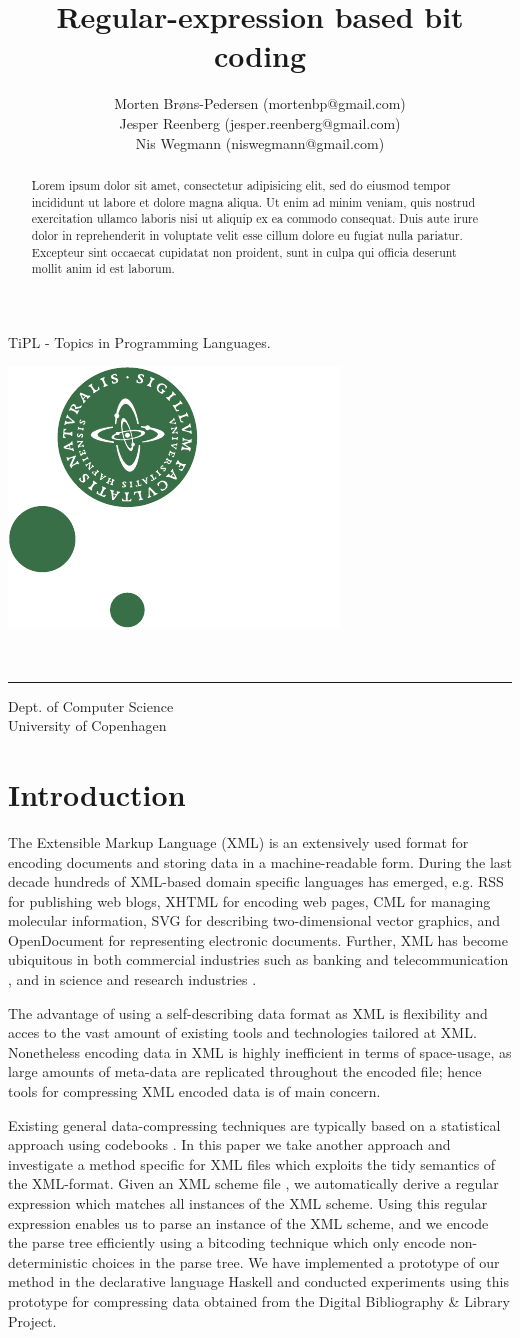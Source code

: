 \documentclass[a4paper, oneside]{memoir}
\title{Regular-expression based bit coding}
\author{Morten Brøns-Pedersen {\footnotesize (mortenbp@gmail.com)}\\
Jesper Reenberg {\footnotesize (jesper.reenberg@gmail.com)} \\
Nis Wegmann {\footnotesize (niswegmann@gmail.com)}}
\makeatletter
\theoremstyle{definition}
\def\maketitle{%
  \null
  \thispagestyle{empty}%
  \vfill
  \begin{center}\leavevmode
    \normalfont
    \Huge{\raggedleft \@title\par}%
    \hrulefill\par
    \Large{\raggedright \subtitle\par}%
    \vskip 2cm
    {\@date\par}%
  \end{center}%
  \vfill
\begin{minipage}{80pt}
\includegraphics*[scale=0.75]{imgs/nat-logo}
\end{minipage}
\begin{minipage}{300pt}
  \begin{flushleft}
    {\large \@author } \\
    {\footnotesize \suplementInfo }

  \end{flushleft}
\end{minipage}
\cleardoublepage %
  \clearpage %
}
\def\subtitle{\footnotesize{TiPL - Topics in Programming Languages.}}
\def\suplementInfo{
  \kern 5pt \hrule width 11pc \kern 5pt %
  Dept. of Computer Science \\
  University of Copenhagen}
\makeatother
\begin{document}
\frontmatter

\maketitle
\thispagestyle{empty}


\begin{abstract}
Lorem ipsum dolor sit amet, consectetur adipisicing elit, sed do eiusmod tempor incididunt ut labore et dolore magna aliqua. Ut enim ad minim veniam, quis nostrud exercitation ullamco laboris nisi ut aliquip ex ea commodo consequat. Duis aute irure dolor in reprehenderit in voluptate velit esse cillum dolore eu fugiat nulla pariatur. Excepteur sint occaecat cupidatat non proident, sunt in culpa qui officia deserunt mollit anim id est laborum.
\end{abstract}

\clearpage 

\tableofcontents*

\mainmatter

\section{Introduction}

The Extensible Markup Language (XML) \cite{FIX ME} is an extensively used format for encoding documents and storing data in a machine-readable form. During the last decade hundreds of XML-based domain specific languages has emerged, e.g. RSS for publishing web blogs, XHTML for encoding web pages, CML for managing molecular information, SVG for describing two-dimensional vector graphics, and OpenDocument for representing electronic documents. Further, XML has become ubiquitous in both commercial industries such as banking and telecommunication \cite{FIX ME}, and in science and research industries \cite{FIX ME}.

The advantage of using a self-describing data format as XML is flexibility and acces to the vast amount of existing tools and technologies tailored at XML. Nonetheless encoding data in XML is highly inefficient in terms of space-usage, as large amounts of meta-data are replicated throughout the encoded file; hence tools for compressing XML encoded data is of main concern.

Existing general data-compressing techniques are typically based on a statistical approach using codebooks \cite{FIX ME}. In this paper we take another approach and investigate a method specific for XML files which exploits the tidy semantics of the XML-format. Given an XML scheme file \cite{FIX ME}, we automatically derive a regular expression which matches all instances of the XML scheme. Using this regular expression enables us to parse an instance of the XML scheme, and we encode the parse tree efficiently using a bitcoding technique which only encode non-deterministic choices in the parse tree. We have implemented a prototype of our method in the declarative language Haskell \cite{FIX ME} and conducted experiments using this prototype for compressing data obtained from the Digital Bibliography \& Library Project.
\end{document}
